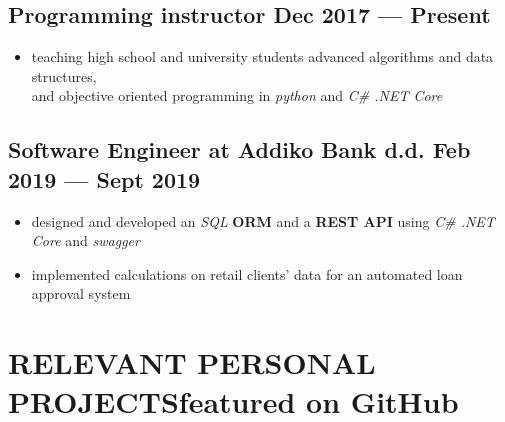 \documentclass{article}
\begin{document}
\subsection{Programming instructor \hfill Dec 2017 --- Present}
\begin{itemize}
  \itemsep0em
  \item teaching high school and university students advanced algorithms and data structures,
    \\and objective oriented programming in \textit{python} and \textit{C\# .NET Core}
\end{itemize}

\subsection{Software Engineer at Addiko Bank d.d. \hfill Feb 2019 --- Sept 2019}
\begin{itemize}
  \itemsep0em
  \item designed and developed an \textit{SQL} {\bfseries ORM} and a {\bfseries REST API} using \textit{C\# .NET Core} and \textit{swagger}
  \item implemented calculations on retail clients' data for an automated loan approval system
\end{itemize}

\section{RELEVANT PERSONAL PROJECTS\hfill featured on GitHub}

\end{document}
